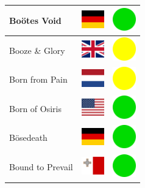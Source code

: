 \documentclass[12pt, a4paper, twoside]{report}
\begin{document}
\begin{center}
\begin{longtable}{|p{5cm}|p{2cm}|p{2cm}|}
 Boötes Void                                                & \includegraphics[width=1cm]{../4x3/de} &   \includegraphics[width=1cm]{../likes/y} \\ \hline
 Booze \& Glory                                             & \includegraphics[width=1cm]{../4x3/gb} &   \includegraphics[width=1cm]{../likes/m} \\ \hline
 Born from Pain                                             & \includegraphics[width=1cm]{../4x3/nl} &   \includegraphics[width=1cm]{../likes/m} \\ \hline
 Born of Osiris                                             & \includegraphics[width=1cm]{../4x3/us} &   \includegraphics[width=1cm]{../likes/y} \\ \hline
 Bösedeath                                                  & \includegraphics[width=1cm]{../4x3/de} &   \includegraphics[width=1cm]{../likes/y} \\ \hline
 Bound to Prevail                                           & \includegraphics[width=1cm]{../4x3/mt} &   \includegraphics[width=1cm]{../likes/y} \\ \hline

\end{longtable}
\end{center}
\end{document}
